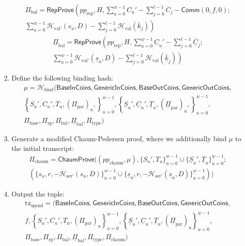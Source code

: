 \documentclass{article}
\newcommand{\func}[1]{\mathsf{#1}}
\newcommand{\comm}{\func{Comm}}
\newcommand{\hash}{\mathcal{H}}
\begin{document}
\begin{enumerate}
    \begin{multline*}
    \Pi_{\text{bal}} = \func{RepProve}\left( pp_{\text{rep}}, H, \sum_{u=0}^{w-1} C_u' - \sum_{j=0}^{t-1} \overline{C}_j - \comm(0,f,0); \right. \\
    \left. \sum_{u=0}^{w-1} \hash_{\text{val}'}(s_u,D) - \sum_{j=0}^{t-1} \hash_{\text{val}}(\overline{k}_j) \right)
    \end{multline*}
    \begin{multline*}
    \underline{\Pi}_{\text{bal}} = \func{RepProve}\left( pp_{\text{rep}}, H, \sum_{u=0}^{\underline{w}-1} \underline{C}_u' - \sum_{j=0}^{\underline{t}-1} \underline{\overline{C}}_j; \right. \\
    \left. \sum_{u=0}^{\underline{w}-1} \hash_{\text{val}'}(\underline{s}_u,D) - \sum_{j=0}^{\underline{t}-1} \hash_{\text{val}}(\underline{\overline{k}}_j) \right)
    \end{multline*}
    \item Define the following binding hash:
    \begin{multline*}
        \mu = \hash_{\text{bind}}( \func{BaseInCoins}, \func{GenericInCoins}, \func{BaseOutCoins}, \func{GenericOutCoins}, \\
        \left\{ S_u', C_u', T_u, (\Pi_{\text{par}})_u, \right\}_{u=0}^{w-1}, \left\{ \underline{S}_u', \underline{C}_u', \underline{T}_u, (\underline{\Pi}_{\text{par}})_u, \right\}_{u=0}^{\underline{w}-1}, \\
        \Pi_{\text{base}}, \Pi_{\text{rp}}, \Pi_{\text{bal}}, \underline{\Pi}_{\text{bal}}, \Pi_{\text{type}} )
    \end{multline*}
    \item Generate a modified Chaum-Pedersen proof, where we additionally bind $\mu$ to the initial transcript:
    \begin{multline*}
    \Pi_{\text{chaum}} = \func{ChaumProve}((pp_{\text{chaum}}, \mu), \{S_u', T_u\}_{u=0}^{w-1} \cup \{\underline{S}_u', \underline{T}_u\}_{u=0}^{\underline{w}-1}; \\
    (\{s_u, r, -\hash_{\text{ser}'}(s_u, D)\}_{u=0}^{w-1} \cup \{\underline{s}_u, r, -\hash_{\text{ser}'}(\underline{s}_u, D)\}_{u=0}^{\underline{w}-1}))
    \end{multline*}
    \item Output the tuple:
    \begin{multline*}
    \text{tx}_{\text{spend}} = ( \func{BaseInCoins}, \func{GenericInCoins}, \func{BaseOutCoins}, \func{GenericOutCoins}, \\
    f, \left\{ S_u', C_u', T_u, (\Pi_{\text{par}})_u \right\}_{u=0}^{w-1}, \left\{ \underline{S}_u', \underline{C}_u', \underline{T}_u, (\underline{\Pi}_{\text{par}})_u \right\}_{u=0}^{\underline{w}-1}, \\
    \Pi_{\text{base}}, \Pi_{\text{rp}}, \Pi_{\text{bal}}, \underline{\Pi}_{\text{bal}}, \Pi_{\text{type}}, \Pi_{\text{chaum}} )
    \end{multline*}
\end{enumerate}
\end{document}

